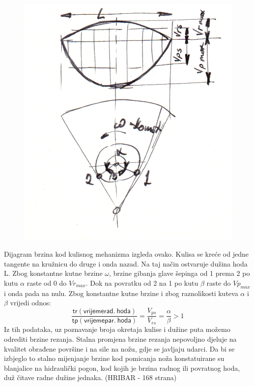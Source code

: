 \documentclass[a4paper,12pt]{article}
\numberwithin{figure}{section}
\begin{document}
\begin{figure}[!h]
\centering
\includegraphics[scale=0.12]{image_15-2.png}
\end{figure}
\FloatBarrier
Dijagram brzina kod kulisnog mehanizma izgleda ovako. Kulisa se kreće od jedne tangente na kružnicu do druge i onda nazad. Na taj način ostvaruje dužina hoda L. Zbog konstantne kutne brzine $\omega$, brzine gibanja glave šepinga od 1 prema 2 po kutu $\alpha$ raste od 0 do $Vr_{max}$. Dok na povratku od 2 na 1 po kutu $\beta$ raste do $Vp_{max}$ i onda pada na nulu. Zbog konstantne kutne brzine i zbog raznolikosti kuteva $\alpha$ i $\beta$ vrijedi odnos:
\begin{equation}
\frac{\mathsf{tr(vrijeme rad.\:hoda)}}{\mathsf{tp(vrijeme par.\:hoda)}} = \frac{V_{ps}}{V_{rs}} = \frac{\alpha}{\beta}>1
\end{equation}
Iz tih podataka, uz poznavanje broja okretaja kulise i dužine puta možemo odrediti brzine rezanja. Stalna promjena brzine rezanja nepovoljno djeluje na kvalitet obrađene površine i na sile na nožu, gdje se javljaju udarci. Da bi se izbjeglo to stalno mijenjanje brzine kod pomicanja noža konstatuirane su blanjalice na hidraulički pogon, kod kojih je brzina radnog ili povratnog hoda, duž čitave radne dužine jednaka. (HRIBAR - 168 strana)
\end{document}

